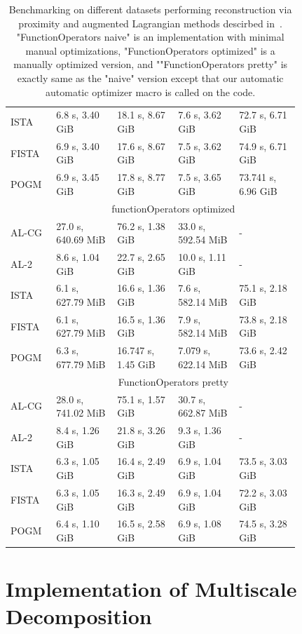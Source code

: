 \begin{table}
\begin{tabular}{|p{0.1\linewidth}|p{0.18\linewidth}p{0.18\linewidth}p{0.18\linewidth}p{0.18\linewidth}|}
ISTA & 6.8 s, 3.40 GiB & 18.1 s, 8.67 GiB & 7.6 s, 3.62 GiB & 72.7 s, 6.71 GiB \\
FISTA & 6.9 s, 3.40 GiB & 17.6 s, 8.67 GiB & 7.5 s, 3.62 GiB & 74.9 s, 6.71 GiB \\
POGM & 6.9 s, 3.45 GiB & 17.8 s, 8.77 GiB & 7.5 s, 3.65 GiB & 73.741 s, 6.96 GiB \\ \hline
\multicolumn{1}{|c|}{} & \multicolumn{4}{c|}{functionOperators optimized} \\
AL-CG & 27.0 s, 640.69 MiB & 76.2 s, 1.38 GiB & 33.0 s, 592.54 MiB & - \\
AL-2 & 8.6 s, 1.04 GiB & 22.7 s, 2.65 GiB & 10.0 s, 1.11 GiB & - \\
ISTA & 6.1 s, 627.79 MiB & 16.6 s, 1.36 GiB & 7.6 s, 582.14 MiB & 75.1 s, 2.18 GiB \\
FISTA & 6.1 s, 627.79 MiB & 16.5 s, 1.36 GiB & 7.9 s, 582.14 MiB & 73.8 s, 2.18 GiB \\
POGM & 6.3 s, 677.79 MiB & 16.747 s, 1.45 GiB & 7.079 s, 622.14 MiB & 73.6 s, 2.42 GiB \\ \hline
\multicolumn{1}{|c|}{} & \multicolumn{4}{c|}{FunctionOperators pretty} \\
AL-CG & 28.0 s, 741.02 MiB & 75.1 s, 1.57 GiB & 30.7 s, 662.87 MiB & - \\
AL-2 & 8.4 s, 1.26 GiB & 21.8 s, 3.26 GiB & 9.3 s, 1.36 GiB & - \\
ISTA & 6.3 s, 1.05 GiB & 16.4 s, 2.49 GiB & 6.9 s, 1.04 GiB & 73.5 s, 3.03 GiB \\
FISTA & 6.3 s, 1.05 GiB & 16.3 s, 2.49 GiB & 6.9 s, 1.04 GiB & 72.2 s, 3.03 GiB \\
POGM & 6.4 s, 1.10 GiB & 16.5 s, 2.58 GiB & 6.9 s, 1.08 GiB & 74.5 s, 3.28 GiB \\ \hline
\end{tabular}
\caption{Benchmarking on different datasets performing reconstruction via proximity and augmented Lagrangian methods descirbed in~\cite{lin_efficient_2019}. "FunctionOperators naive" is an implementation with minimal manual optimizations, "FunctionOperators optimized" is a manually optimized version, and ""FunctionOperators pretty" is exactly same as the "naive" version except that our automatic automatic optimizer macro is called on the code.}
\label{tab:lin_fessler}
\end{table}

\section{Implementation of Multiscale Decomposition}

